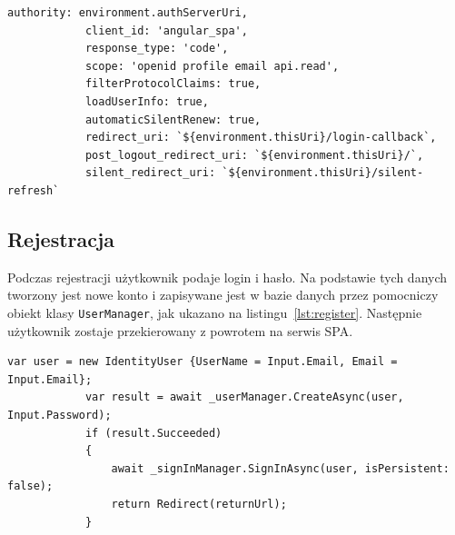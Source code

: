 		\begin{lstlisting}[label=lst:openIdSpa, caption=Konfiguracja OpenId po stronie Spa, float]
			authority: environment.authServerUri,
			client_id: 'angular_spa',
			response_type: 'code',
			scope: 'openid profile email api.read',
			filterProtocolClaims: true,
			loadUserInfo: true,
			automaticSilentRenew: true,
			redirect_uri: `${environment.thisUri}/login-callback`,
			post_logout_redirect_uri: `${environment.thisUri}/`,
			silent_redirect_uri: `${environment.thisUri}/silent-refresh`
		\end{lstlisting}

	\subsection{Rejestracja}
		Podczas rejestracji użytkownik podaje login i hasło.
		Na podstawie tych danych tworzony jest nowe konto i zapisywane jest w bazie danych przez pomocniczy obiekt klasy \verb|UserManager|,
		jak ukazano na listingu~\ref{lst:register}.
		Następnie użytkownik zostaje przekierowany z powrotem na serwis SPA.

		\begin{lstlisting}[label=lst:register, caption=Fragment kodu rejestacji, float]
			var user = new IdentityUser {UserName = Input.Email, Email = Input.Email};
			var result = await _userManager.CreateAsync(user, Input.Password);
			if (result.Succeeded)
			{
				await _signInManager.SignInAsync(user, isPersistent: false);
				return Redirect(returnUrl);
			}
		\end{lstlisting}

